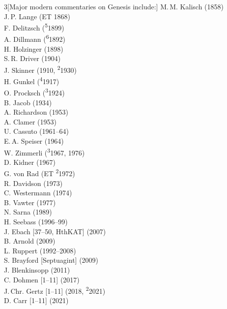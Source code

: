 \documentclass[titlepage]{article}
\begin{document}
\begin{multicols}{3}[Major modern commentaries on Genesis include:]%
\footnotesize\noindent
M.\,M. Kalisch (1858)\\
J.\,P. Lange (ET 1868)\\
F. Delitzsch (\textsuperscript{5}1899)\\
A. Dillmann (\textsuperscript{6}1892)\\
H. Holzinger (1898)\\
S.\,R. Driver (1904)\\
J. Skinner (1910, \textsuperscript{2}1930)\\
H. Gunkel (\textsuperscript{4}1917)\\
O. Procksch (\textsuperscript{3}1924)\\
B. Jacob (1934)\\
A. Richardson (1953)\\
A. Clamer (1953)\\
U. Cassuto (1961--64)\\
E.\,A. Speiser (1964)\\
W. Zimmerli (\textsuperscript{3}1967, 1976)\\
D. Kidner (1967)\\
G. von Rad (ET \textsuperscript{2}1972)\\
R. Davidson (1973)\\
C. Westermann (1974)\\
B. Vawter (1977)\\
N. Sarna (1989)\\
H. Seebass (1996--99)\\
J. Ebach [37--50, HthKAT] (2007)\\
B. Arnold (2009)\\
L. Ruppert (1992--2008)\\
S. Brayford [Septuagint] (2009)\\
J. Blenkinsopp (2011)\\
C. Dohmen [1--11] (2017)\\
J.\,Chr. Gertz [1--11] (2018, \textsuperscript{2}2021)\\
D. Carr [1--11] (2021)
\end{multicols}
\end{document}
